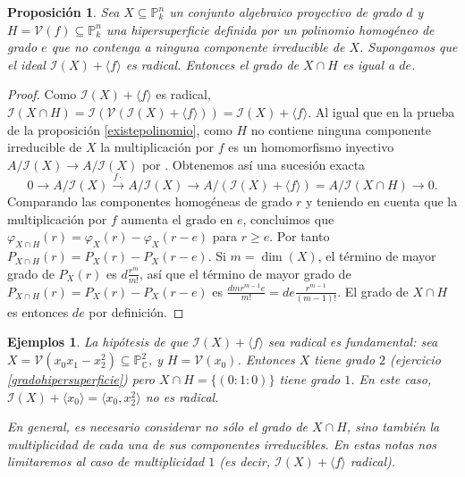 \documentclass[a4paper,10pt]{book}
\newtheorem{prop}[thm]{Proposición}
\newtheorem{eje}[thm]{Ejemplos}
\newcommand{\CC}{\mathbb C}
\newcommand{\PP}{\mathbb P}
\newcommand{\Pnk}{\PP^n_k}
\newcommand{\II}{{\mathcal I}}
\newcommand{\VV}{{\mathcal V}}
\begin{document}
\begin{prop}\label{gradointerseccion}
 Sea $X\subseteq\Pnk$ un conjunto algebraico proyectivo de grado $d$ y $H=\VV(f)\subseteq\Pnk$ una hipersuperficie definida por un polinomio homogéneo de grado $e$ que no contenga a ninguna componente irreducible de $X$. Supongamos que el ideal $\II(X)+\langle f\rangle$ es radical. Entonces el grado de $X\cap H$ es igual a $de$.
\end{prop}

\begin{proof}
 Como $\II(X)+\langle f\rangle$ es radical, $\II(X\cap H)=\II(\VV(\II(X)+\langle f\rangle))=\II(X)+\langle f\rangle$. Al igual que en la prueba de la proposición \ref{existepolinomio}, como $H$ no contiene ninguna componente irreducible de $X$ la multiplicación por $f$ es un homomorfismo inyectivo $A/\II(X)\to A/\II(X)$ por \cite[Proposición 4.7]{am}. Obtenemos así una sucesión exacta
$$
0\to A/\II(X)\stackrel{f \cdot}{\to} A/\II(X) \to A/(\II(X)+\langle f\rangle)=A/\II(X\cap H)\to 0.
$$
Comparando las componentes homogéneas de grado $r$ y teniendo en cuenta que la multiplicación por $f$ aumenta el grado en $e$, concluimos que $\varphi_{X\cap H}(r)=\varphi_X(r)-\varphi_X(r-e)$ para $r\geq e$. Por tanto $P_{X\cap H}(r)=P_X(r)-P_X(r-e)$. Si $m=\dim(X)$, el término de mayor grado de $P_X(r)$ es $d\frac{r^m}{m!}$, así que el término de mayor grado de $P_{X\cap H}(r)=P_X(r)-P_X(r-e)$ es $\frac{dmr^{m-1}e}{m!}=de\frac{r^{m-1}}{(m-1)!}$. El grado de $X\cap H$ es entonces $de$ por definición. 
\end{proof}

\begin{eje}
 \emph{La hipótesis de que $\II(X)+\langle f\rangle$ sea radical es fundamental: sea $X=\VV(x_0x_1-x_2^2)\subseteq\PP^2_\CC$, y $H=\VV(x_0)$. Entonces $X$ tiene grado $2$ (ejercicio \ref{gradohipersuperficie}) pero $X\cap H=\{(0:1:0)\}$ tiene grado $1$. En este caso, $\II(X)+\langle x_0\rangle=\langle x_0,x_2^2\rangle$ no es radical.}

\emph{En general, es necesario considerar no sólo el grado de $X\cap H$, sino también la \emph{multiplicidad} de cada una de sus componentes irreducibles. En estas notas nos limitaremos al caso de multiplicidad $1$ (es decir, $\II(X)+\langle f\rangle$ radical).}
\end{eje}
\end{document}
